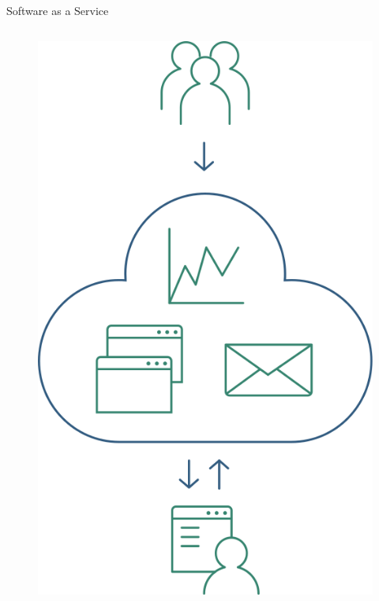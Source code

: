 \documentclass[10pt,xcolor=table ]{beamer}
\begin{document}
\begin{frame}{Software as a Service}
\begin{columns}[c,onlytextwidth]
\begin{figure}[H]
			\includegraphics[scale=0.23]{../Figuras/saas}
		\end{figure}
  	\end{columns}
\end{frame}
\end{document}
